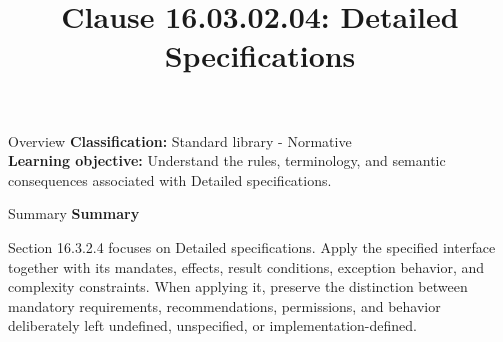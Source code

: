 \documentclass[10pt,letterpaper]{article}
\title{Clause 16.03.02.04: Detailed Specifications}
\author{}
\date{}
\begin{document}
\maketitle
\begin{CornellOverviewBox}{Overview}
\textbf{Classification:} Standard library - Normative\\[2pt]
\textbf{Learning objective:} Understand the rules, terminology, and semantic consequences associated with Detailed specifications.
\end{CornellOverviewBox}\begin{CornellSummaryBox}{Summary}
{\sffamily\bfseries\color{Accent} Summary}\par\vspace{3pt}Section 16.3.2.4 focuses on Detailed specifications. Apply the specified interface together with its mandates, effects, result conditions, exception behavior, and complexity constraints. When applying it, preserve the distinction between mandatory requirements, recommendations, permissions, and behavior deliberately left undefined, unspecified, or implementation-defined.
\end{CornellSummaryBox}
\end{document}
